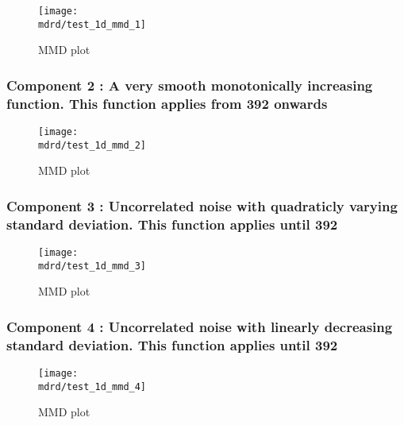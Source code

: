 \documentclass{article} %
\begin{document}
\begin{figure}[H]
\newcommand{\wmgd}{0.5\columnwidth}
\newcommand{\hmgd}{3.0cm}
\newcommand{\mdrd}{test_1d}
\newcommand{\mbm}{\hspace{-0.3cm}}
\texttt{[image: \\mdrd/test\_1d\_mmd\_1]}
\caption{
MMD plot}
\label{fig:mmd1}
\end{figure}

\subsubsection{Component 2 : A very smooth monotonically increasing function. This function applies from  392 onwards}

\begin{figure}[H]
\newcommand{\wmgd}{0.5\columnwidth}
\newcommand{\hmgd}{3.0cm}
\newcommand{\mdrd}{test_1d}
\newcommand{\mbm}{\hspace{-0.3cm}}
\texttt{[image: \\mdrd/test\_1d\_mmd\_2]}
\caption{
MMD plot}
\label{fig:mmd2}
\end{figure}

\subsubsection{Component 3 : Uncorrelated noise with quadraticly varying standard deviation. This function applies until  392}

\begin{figure}[H]
\newcommand{\wmgd}{0.5\columnwidth}
\newcommand{\hmgd}{3.0cm}
\newcommand{\mdrd}{test_1d}
\newcommand{\mbm}{\hspace{-0.3cm}}
\texttt{[image: \\mdrd/test\_1d\_mmd\_3]}
\caption{
MMD plot}
\label{fig:mmd3}
\end{figure}

\subsubsection{Component 4 : Uncorrelated noise with linearly decreasing standard deviation. This function applies until  392}

\begin{figure}[H]
\newcommand{\wmgd}{0.5\columnwidth}
\newcommand{\hmgd}{3.0cm}
\newcommand{\mdrd}{test_1d}
\newcommand{\mbm}{\hspace{-0.3cm}}
\texttt{[image: \\mdrd/test\_1d\_mmd\_4]}
\caption{
MMD plot}
\label{fig:mmd4}
\end{figure}
\end{document}
